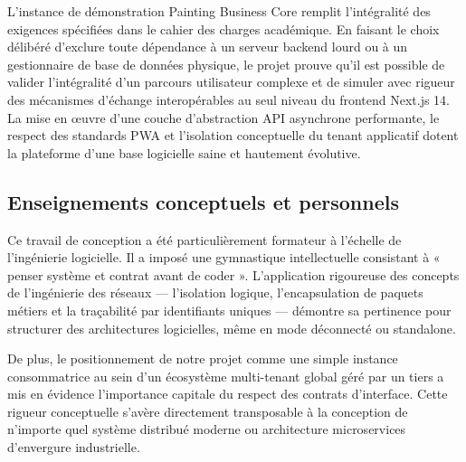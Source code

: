 \documentclass[12pt,a4paper]{report}
\begin{document}
L'instance de démonstration Painting Business Core remplit l'intégralité des exigences spécifiées dans le cahier des charges académique. En faisant le choix délibéré d'exclure toute dépendance à un serveur backend lourd ou à un gestionnaire de base de données physique, le projet prouve qu'il est possible de valider l'intégralité d'un parcours utilisateur complexe et de simuler avec rigueur des mécanismes d'échange interopérables au seul niveau du frontend Next.js 14. La mise en œuvre d'une couche d'abstraction API asynchrone performante, le respect des standards PWA et l'isolation conceptuelle du tenant applicatif dotent la plateforme d'une base logicielle saine et hautement évolutive.

\subsection{Enseignements conceptuels et personnels}

Ce travail de conception a été particulièrement formateur à l'échelle de l'ingénierie logicielle. Il a imposé une gymnastique intellectuelle consistant à « penser système et contrat avant de coder ». L'application rigoureuse des concepts de l'ingénierie des réseaux --- l'isolation logique, l'encapsulation de paquets métiers et la traçabilité par identifiants uniques --- démontre sa pertinence pour structurer des architectures logicielles, même en mode déconnecté ou standalone.

De plus, le positionnement de notre projet comme une simple instance consommatrice au sein d'un écosystème multi-tenant global géré par un tiers a mis en évidence l'importance capitale du respect des contrats d'interface. Cette rigueur conceptuelle s'avère directement transposable à la conception de n'importe quel système distribué moderne ou architecture microservices d'envergure industrielle.
\end{document}
